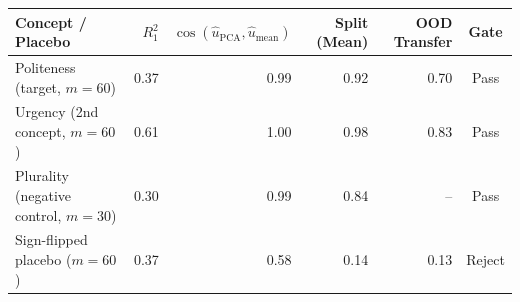 \begin{tabular}{@{}l rrrrc@{}}
\toprule
Concept / Placebo & $R_1^2$ & $\cos(\hat{u}_{\mathrm{PCA}}, \hat{u}_{\mathrm{mean}})$ & Split (Mean) & OOD Transfer & Gate \\
\midrule
Politeness (target, $m=60$) & 0.37 & 0.99 & 0.92 & 0.70 & Pass \\
Urgency (2nd concept, $m=60$) & 0.61 & 1.00 & 0.98 & 0.83 & Pass \\
Plurality (negative control, $m=30$) & 0.30 & 0.99 & 0.84 & -- & Pass \\
Sign-flipped placebo ($m=60$) & 0.37 & 0.58 & 0.14 & 0.13 & Reject \\
\bottomrule
\end{tabular}
